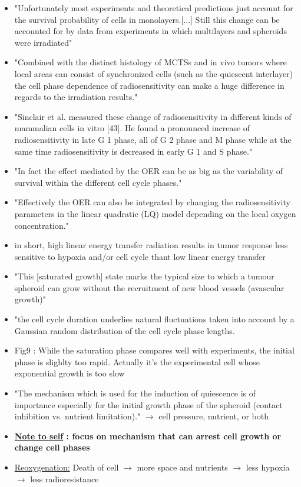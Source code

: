 \documentclass[11pt,a4paper]{article}
\begin{document}
\begin{itemize}
\item "Unfortunately most experiments and theoretical predictions just account for the survival probability of cells in monolayers.[...] Still this change can be accounted for by data from experiments in which multilayers and spheroids were irradiated"
\item "Combined with the distinct histology of MCTSs and in vivo tumors where local areas can consist of synchronized cells (such as the quiescent interlayer) the cell phase dependence of radiosensitivity can make a huge difference in regards to the irradiation results."
\item "Sinclair et al. measured these change of radiosensitivity in different kinds of mammalian cells in vitro [43]. He found a pronounced increase of radiosensitivity in late G 1 phase, all of G 2 phase and M phase while at the same time radiosensitivity is decreased in early G 1 and S phase."
\item "In fact the effect mediated by the OER can be as big as the variability of survival within the different cell cycle phases."
\item "Effectively the OER can also be integrated by changing the radiosensitivity parameters in the linear quadratic (LQ) model depending on the local oxygen concentration."
\item  in short, high linear energy transfer radiation results in tumor response less sensitive to hypoxia and/or cell cycle thant low linear energy  transfer
\item "This [saturated growth] state marks the typical size to which a tumour spheroid can grow without the recruitment of new blood vessels (avascular growth)"
\item "the cell cycle duration underlies natural fluctuations taken into account by a Gaussian random distribution of the cell cycle phase lengths.
\item Fig9 : While the saturation phase compares well with experiments, the initial phase is slighlty too rapid. Actually it's the experimental cell whose exponential growth is too slow
\item "The mechanism which is used for the induction of quiescence is of importance especially for the initial growth phase of the spheroid (contact inhibition vs. nutrient limitation)." $\rightarrow$ cell pressure, nutrient, or both
\item \textbf{\underline{Note to self} : focus on mechanism that can arrest cell growth or change cell phases}
\item \underline{Reoxygenation:} Death of cell $\rightarrow$ more space and nutrients $\rightarrow$ less hypoxia $\rightarrow$ less radioresistance

\end{itemize}
\end{document}
